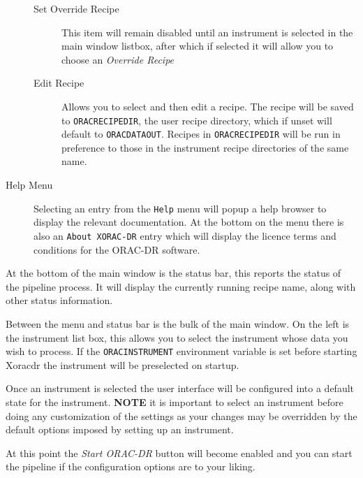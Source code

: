 \documentclass[twoside,11pt]{article}
\renewcommand{\_}{\texttt{\symbol{95}}}
\begin{document}
\begin{description}
\begin{description}
\item[Set Override Recipe] \mbox{}

This item will remain disabled until an instrument is selected in the
main window listbox, after which if selected it will allow you to
choose an \textit{Override Recipe}


\item[Edit Recipe] \mbox{}

Allows you to select and then edit a recipe. The recipe will be saved
to \texttt{ORAC\_RECIPE\_DIR}, the user recipe directory, which if unset will
default to \texttt{ORAC\_DATA\_OUT}. Recipes in \texttt{ORAC\_RECIPE\_DIR} will be run
in preference to those in the instrument recipe directories of the
same name.

\end{description}

\item[Help Menu] \mbox{}

Selecting an entry from the \texttt{Help} menu will popup a help browser to
display the relevant documentation. At the bottom on the menu there is
also an \texttt{About XORAC-DR} entry which will display the licence terms
and conditions for the ORAC-DR software.

\end{description}


At the bottom of the main window is the status bar, this reports the
status of the pipeline process. It will display the currently running
recipe name, along with other status information.



Between the menu and status bar is the bulk of the main window. On the
left is the instrument list box, this allows you to select the
instrument whose data you wish to process. If the \texttt{ORAC\_INSTRUMENT}
environment variable is set before starting Xoracdr the instrument
will be preselected on startup.



Once an instrument is selected the user interface will be configured
into a default state for the instrument. \textbf{NOTE} it is important to
select an instrument before doing any customization of the settings as
your changes may be overridden by the default options imposed by
setting up an instrument.



At this point the \textit{Start ORAC-DR} button will become enabled and you
can start the pipeline if the configuration options are to your
liking.
\end{document}
